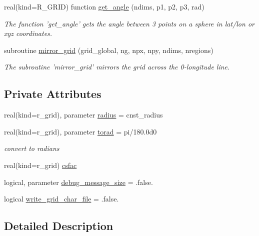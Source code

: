 \begin{DoxyCompactItemize}
real(kind=R\-\_\-\-G\-R\-I\-D) function \hyperlink{classfv__grid__tools__mod_a2c7315c9bca27cf1f44788c92969d803}{get\-\_\-angle} (ndims, p1, p2, p3, rad)
\begin{DoxyCompactList}\small\item\em The function 'get\-\_\-angle' gets the angle between 3 points on a sphere in lat/lon or xyz coordinates. \end{DoxyCompactList}\item 
subroutine \hyperlink{classfv__grid__tools__mod_af7a3501736417ecd39ca2f011e36304b}{mirror\-\_\-grid} (grid\-\_\-global, ng, npx, npy, ndims, nregions)
\begin{DoxyCompactList}\small\item\em The subroutine 'mirror\-\_\-grid' mirrors the grid across the 0-\/longitude line. \end{DoxyCompactList}\end{DoxyCompactItemize}
\subsection*{Private Attributes}
\begin{DoxyCompactItemize}
\item 
real(kind=r\-\_\-grid), parameter \hyperlink{classfv__grid__tools__mod_a832e50f3831e3af6951de1a9ed21fe33}{radius} = cnst\-\_\-radius
\item 
real(kind=r\-\_\-grid), parameter \hyperlink{classfv__grid__tools__mod_a532808a493ee0706dd78a3383537ad9a}{torad} = pi/180.\-0d0
\begin{DoxyCompactList}\small\item\em convert to radians \end{DoxyCompactList}\item 
real(kind=r\-\_\-grid) \hyperlink{classfv__grid__tools__mod_a0f01babe8d2ff57cd92783b91dc4cccd}{csfac}
\item 
logical, parameter \hyperlink{classfv__grid__tools__mod_a05413bb63130f63c7356403130c339bd}{debug\-\_\-message\-\_\-size} = .false.
\item 
logical \hyperlink{classfv__grid__tools__mod_ab05dbcee57bb7bce7cb38d1b50f8aa69}{write\-\_\-grid\-\_\-char\-\_\-file} = .false.
\end{DoxyCompactItemize}


\subsection{Detailed Description}



